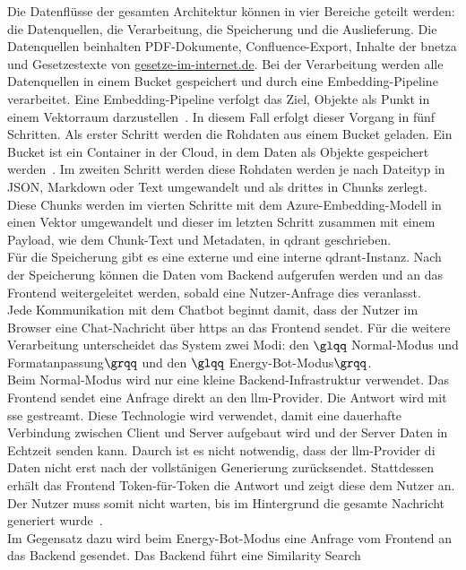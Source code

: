 Die Datenflüsse der gesamten Architektur können in vier Bereiche geteilt werden: die Datenquellen, die Verarbeitung, die Speicherung und die
Auslieferung. Die Datenquellen beinhalten PDF-Dokumente, Confluence-Export, Inhalte der \ac{bnetza} und Gesetzestexte von
\url{gesetze-im-internet.de}. 
Bei der Verarbeitung werden alle Datenquellen in einem Bucket gespeichert und durch eine Embedding-Pipeline verarbeitet. Eine Embedding-Pipeline verfolgt das Ziel,
Objekte als Punkt in einem Vektorraum darzustellen~\cite{an20}. In diesem Fall erfolgt dieser Vorgang in fünf Schritten. Als erster Schritt werden die Rohdaten
aus einem Bucket geladen. Ein Bucket ist ein Container in der Cloud, in dem Daten als Objekte gespeichert werden~\cite{an19}. Im zweiten Schritt werden 
diese Rohdaten werden je nach Dateityp
in JSON, Markdown oder Text umgewandelt und als drittes in Chunks zerlegt. Diese Chunks werden im vierten Schritte mit dem Azure-Embedding-Modell in einen Vektor umgewandelt und dieser 
im letzten Schritt zusammen mit einem Payload, wie dem Chunk-Text und Metadaten, in \gls{qdrant} geschrieben. \\
Für die Speicherung gibt es eine externe und eine interne \gls{qdrant}-Instanz. Nach der Speicherung können die Daten vom Backend aufgerufen werden und an das 
Frontend weitergeleitet werden, sobald eine Nutzer-Anfrage dies veranlasst. \\
Jede Kommunikation mit dem Chatbot beginnt damit, dass der Nutzer im Browser eine Chat-Nachricht über \ac{https} an das Frontend sendet. Für die
weitere Verarbeitung unterscheidet das System zwei Modi: den $\glqq$ Normal-Modus und Formatanpassung$\grqq$ und den $\glqq$ Energy-Bot-Modus$\grqq$. \\
Beim Normal-Modus wird nur eine kleine Backend-Infrastruktur verwendet. Das Frontend sendet eine Anfrage direkt an den \ac{llm}-Provider. Die Antwort wird mit 
\ac{sse} gestreamt. Diese Technologie wird verwendet, damit eine dauerhafte Verbindung zwischen Client und Server aufgebaut wird
und der Server Daten in Echtzeit senden kann. Daurch ist es nicht notwendig, dass der \ac{llm}-Provider di Daten nicht erst nach der vollstänigen Generierung 
zurücksendet. Stattdessen erhält das Frontend Token-für-Token die Antwort und zeigt diese dem Nutzer an. Der Nutzer muss somit nicht warten, bis im Hintergrund die 
gesamte Nachricht generiert wurde~\cite{an18}. \\
Im Gegensatz dazu wird beim Energy-Bot-Modus eine Anfrage vom Frontend an das Backend gesendet. Das Backend führt eine Similarity Search
